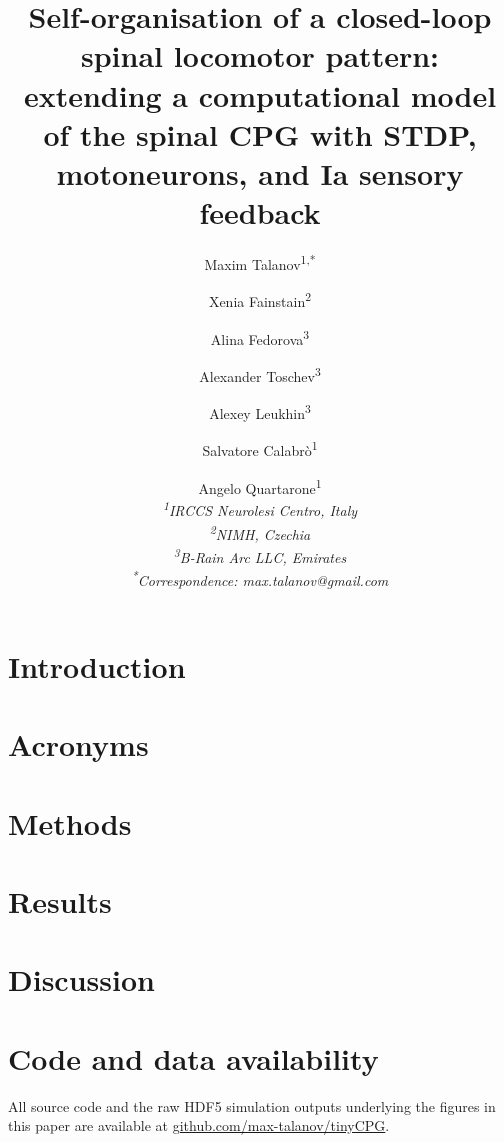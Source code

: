 \documentclass[11pt,letterpaper]{article}
\title{Self-organisation of a closed-loop spinal locomotor pattern: \\
       extending a computational model of the spinal CPG with STDP,
       motoneurons, and Ia sensory feedback}
\author{
  Maxim Talanov\textsuperscript{1,*} \and
  Xenia Fainstain\textsuperscript{2} \and
  Alina Fedorova\textsuperscript{3} \and
  Alexander Toschev\textsuperscript{3} \and
  Alexey Leukhin\textsuperscript{3} \and
  Salvatore Calabr\`o\textsuperscript{1} \and
  Angelo Quartarone\textsuperscript{1}
  \\[1em]
  \textit{\small \textsuperscript{1}IRCCS Neurolesi Centro, Italy} \\
  \textit{\small \textsuperscript{2}NIMH, Czechia} \\
  \textit{\small \textsuperscript{3}B-Rain Arc LLC, Emirates} \\
  \textit{\small \textsuperscript{*}Correspondence: max.talanov@gmail.com}
}
\date{}
\begin{document}
\maketitle

% 

\section{Introduction}\label{sec:intro}


\section{Acronyms}\label{sec:acronyms}


\section{Methods}\label{sec:methods}


\section{Results}\label{sec:results}


\section{Discussion}\label{sec:discussion}




\section*{Code and data availability}
All source code and the raw HDF5 simulation outputs underlying the figures in
this paper are available at
\href{https://github.com/max-talanov/tinyCPG}{github.com/max-talanov/tinyCPG}.


\end{document}
